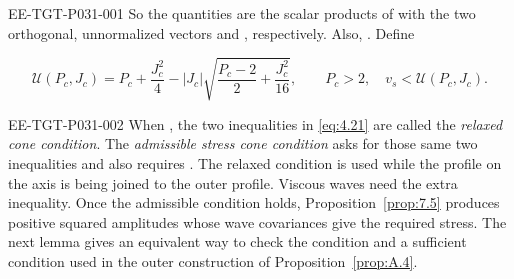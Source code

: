 %
\begin{EESegment}{EE-TGT-P031-001}
So the quantities  are the scalar products of
 with the two orthogonal, unnormalized vectors
 and , respectively.
Also, . Define
\end{EESegment}
\begin{equation}
  \mathcal{U}(P_c,J_c)=P_c+\frac{J_c^2}{4}-|J_c|\sqrt{\frac{P_c-2}{2}+\frac{J_c^2}{16}},
  \qquad P_c>2,\quad v_s<\mathcal{U}(P_c,J_c).
  \tag{4.21}\label{eq:4.21}
\end{equation}
\begin{EESegment}{EE-TGT-P031-002}
When , the two inequalities in \eqref{eq:4.21} are
called the \emph{relaxed cone condition}. The \emph{admissible stress cone
condition} asks for those same two inequalities and also requires
. The relaxed condition is used while the profile
on the axis is being joined to the outer profile. Viscous waves need the
extra inequality. Once the admissible condition holds,
Proposition~\ref{prop:7.5} produces positive squared amplitudes whose wave
covariances give the required stress. The next lemma gives an equivalent way
to check the condition and a sufficient condition used in the outer
construction of Proposition~\ref{prop:A.4}.
\end{EESegment}

